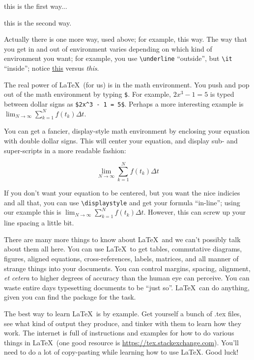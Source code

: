 \centerline{this is the first way...}

\begin{center}
	this is the second way.
\end{center}

\noindent Actually there is one more way, used above; for example, {\sc this way}.
The way that you get in and out of environment varies depending on which kind of environment you want; for example, you use \verb|\underline| ``outside'', but \verb|\it| ``inside''; notice \underline{this} versus {\it this}.

The real power of \LaTeX\ (for us) is in the math environment.
You push and pop out of the math environment by typing \verb|$|.
For example, $2x^3 - 1 = 5$ is typed between dollar signs as \verb|$2x^3 - 1 = 5$|.
Perhaps a more interesting example is $\lim_{N \to \infty} \sum_{k=1}^N f(t_k) \Delta t$.

You can get a fancier, display-style math environment by enclosing your equation with double dollar signs.
This will center your equation, and display sub- and super-scripts in a more readable fashion:

$$\lim_{N \to \infty} \sum_{k=1}^N f(t_k) \Delta t$$

If you don't want your equation to be centered, but you want the nice indicies and all that, you can use \verb|\displaystyle| and get your formula ``in-line''; using our example this is $\displaystyle \lim_{N \to \infty} \sum_{k=1}^N f(t_k) \Delta t$.
However, this can screw up your line spacing a little bit.

There are many more things to know about \LaTeX\ and we can't possibly talk about them all here.
You can use \LaTeX\ to get tables, commutative diagrams, figures, aligned equations, cross-references, labels, matrices, and all manner of strange things into your documents.
You can control margins, spacing, alignment, {\it et cetera} to higher degrees of accuracy than the human eye can perceive.
You can waste entire days typesetting documents to be ``just so''.
\LaTeX\ can do anything, given you can find the package for the task.

The best way to learn \LaTeX\ is by example.
Get yourself a bunch of .tex files, see what kind of output they produce, and tinker with them to learn how they work.
The internet is full of instructions and examples for how to do various things in \LaTeX\ (one good resource is \url{https://tex.stackexchange.com}).
You'll need to do a lot of copy-pasting while learning how to use \LaTeX.
Good luck!

